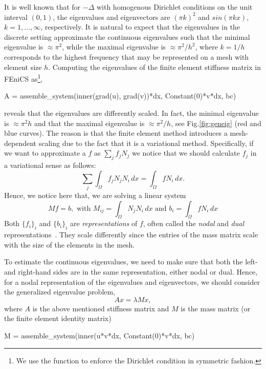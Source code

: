 It is well known that for $-\Delta$  with homogenous Dirichlet conditions on the unit
interval $(0,1)$, 
the eigenvalues 
and eigenvectors
are $(\pi k)^2$ and $sin(\pi k x)$, $k=1, \ldots, \infty$, respectively. 
It is natural to expect that the eigenvalues in the discrete setting
approximate the continuous eigenvalues such that 
the minimal eigenvalue is $\approx \pi^2$, while the maximal eigenvalue
is $\approx \pi^2 /h^2$, where $k=1/h$ corresponds to the highest frequency that may be represented
on a mesh with element size $h$.  
Computing the eigenvalues of the finite element stiffness matrix in FEniCS as\footnote{
We use the  function to enforce the Dirichlet
condition in symmetric fashion.}, 
\begin{python}
A = assemble_system(inner(grad(u), grad(v))*dx, Constant(0)*v*dx, bc)
\end{python}
reveals that the eigenvalues are differently scaled. In fact, the minimal 
eigenvalue is $\approx \pi^2 h$ and that the maximal eigenvalue is  $\approx \pi^2/h$, see Fig.\ref{fig:geneig} (red and blue curves).      
The reason is that the finite element method introduces a mesh-dependent 
scaling due to the fact that it is a variational method. 
Specifically, if we want to approximate a $f$ as $\sum_j f_j N_j$ we notice
that we should calculate $f_j$ in a variational sense as follows: 
\[
 \sum_j \int_\Omega f_j N_j N_i \, dx = \int_\Omega f N_i \, dx  .  
\]
Hence, we notice here that, we are solving a linear system
\[
	M f = b, \mbox{ with } M_{ij} = \int_\Omega N_j N_i \, dx \mbox{ and } b_i = \int_\Omega f N_i \, dx  
\]
Both $\{f_i\}_i$ and $\{b_i\}_i$ are \emph{representations} of $f$, often called the \emph{nodal} and \emph{dual} representations~\cite{mardal2011preconditioning}. They scale differently since
the entries of the mass matrix scale with the size of the elements in the mesh. 

To estimate the continuous eigenvalues, we  need to make sure that both the left- and right-hand sides are in the same representation, either nodal
or dual. Hence, for a nodal representation of the eigenvalues and eigenvectors, we should consider the generalized eigenvalue problem, 
\begin{equation} 
\label{geneig}
A x = \lambda M x,   
\end{equation} 
where $A$ is the above mentioned stiffness matrix and $M$ is the mass
matrix (or the finite element identity matrix) 
\begin{python}
M = assemble_system(inner(u*v*dx, Constant(0)*v*dx, bc)
\end{python}

